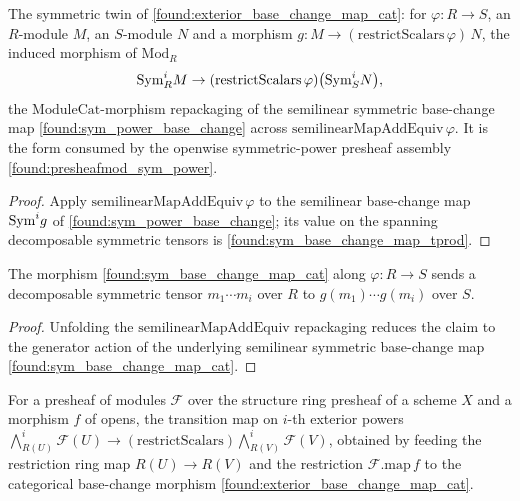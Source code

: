 \begin{lemma}
  \label{found:sym_base_change_map_cat}
  The symmetric twin of \cref{found:exterior_base_change_map_cat}: for
  \(\varphi:R\to S\), an \(R\)-module \(M\), an \(S\)-module \(N\) and a morphism
  \(g:M\to(\mathrm{restrictScalars}\,\varphi)\,N\), the induced morphism of
  \(\mathrm{Mod}_R\)
  \[
    \mathrm{Sym}^i_R M\to(\mathrm{restrictScalars}\,\varphi)\bigl(\mathrm{Sym}^i_S N\bigr),
  \]
  the \(\mathrm{ModuleCat}\)-morphism repackaging of the semilinear symmetric
  base-change map \cref{found:sym_power_base_change} across
  \(\mathrm{semilinearMapAddEquiv}\,\varphi\).  It is the form consumed by the
  openwise symmetric-power presheaf assembly \cref{found:presheafmod_sym_power}.
\end{lemma}

\begin{proof}
  \leanok
  Apply \(\mathrm{semilinearMapAddEquiv}\,\varphi\) to the semilinear base-change map
  \(\mathrm{Sym}^i g\) of \cref{found:sym_power_base_change}; its value on the spanning
  decomposable symmetric tensors is \cref{found:sym_base_change_map_tprod}.
\end{proof}

\begin{lemma}
  \label{found:sym_base_change_map_cat_tprod}
  The morphism \cref{found:sym_base_change_map_cat} along \(\varphi:R\to S\) sends a
  decomposable symmetric tensor \(m_1\cdots m_i\) over \(R\) to
  \(g(m_1)\cdots g(m_i)\) over \(S\).
\end{lemma}

\begin{proof}
  \leanok
  Unfolding the \(\mathrm{semilinearMapAddEquiv}\) repackaging reduces the claim to
  the generator action of the underlying semilinear symmetric base-change map
  \cref{found:sym_base_change_map_cat}.
\end{proof}

\begin{lemma}
  \label{found:presheafmod_extpowmap}
  For a presheaf of modules \(\mathcal F\) over the structure ring presheaf of a
  scheme \(X\) and a morphism \(f\) of opens, the transition map on \(i\)-th exterior
  powers
  \(\bigwedge^i_{R(U)}\mathcal F(U)\to(\mathrm{restrictScalars})\bigwedge^i_{R(V)}\mathcal F(V)\),
  obtained by feeding the restriction ring map \(R(U)\to R(V)\) and the restriction
  \(\mathcal F.\mathrm{map}\,f\) to the categorical base-change morphism
  \cref{found:exterior_base_change_map_cat}.
\end{lemma}

